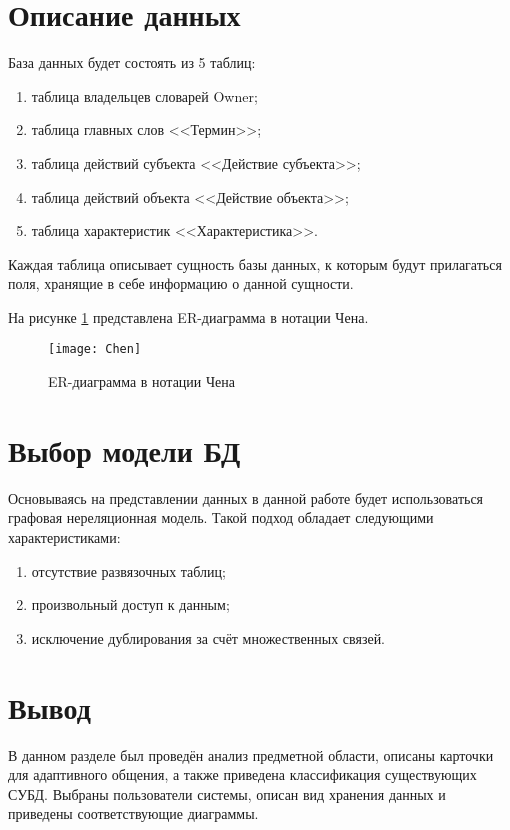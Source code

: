 \section{Описание данных}

База данных будет состоять из 5 таблиц:
\begin{enumerate}[label=\arabic*.]
	\item таблица владельцев словарей Owner;
	\item таблица главных слов <<Термин>>;
	\item таблица действий субъекта <<Действие субъекта>>;
	\item таблица действий объекта <<Действие объекта>>;
	\item таблица характеристик <<Характеристика>>.
\end{enumerate}

Каждая таблица описывает сущность базы данных, к которым будут прилагаться поля, хранящие в себе информацию о данной сущности.

На рисунке \ref{chen} представлена ER-диаграмма в нотации Чена.

\pagebreak

\begin{figure}[ht!]\centering
	\texttt{[image: Chen]}
	\caption{ER-диаграмма в нотации Чена}
	\label{chen}
\end{figure}

\section{Выбор модели БД}

Основываясь на представлении данных в данной работе будет использоваться графовая нереляционная модель. Такой подход обладает следующими характеристиками:
\begin{enumerate}[label=\arabic*.]
	\item отсутствие развязочных таблиц;
	\item произвольный доступ к данным;
	\item исключение дублирования за счёт множественных связей.
\end{enumerate}

\section*{Вывод}

В данном разделе был проведён анализ предметной области, описаны карточки для адаптивного общения, а также приведена классификация существующих СУБД. Выбраны пользователи системы, описан вид хранения данных и приведены соответствующие диаграммы.